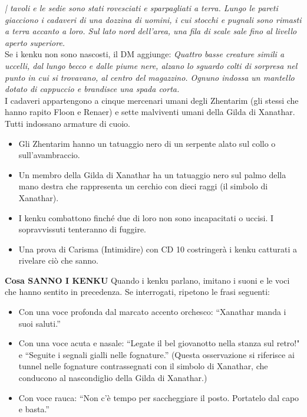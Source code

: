 \documentclass{article}
\begin{document}
\textit{| tavoli e le sedie sono stati rovesciati e sparpagliati a
terra. Lungo le pareti giacciono i cadaveri di una dozzina
di uomini, i cui stocchi e pugnali sono rimasti a terra
accanto a loro. Sul lato nord dell'area, una fila di scale
sale fino al livello aperto superiore.} \\
Se i kenku non sono nascosti, il DM aggiunge:
\textit{Quattro basse creature simili a uccelli, dal lungo becco
e dalle piume nere, alzano lo sguardo colti di sorpresa
nel punto in cui si trovavano, al centro del magazzino.
Ognuno indossa un mantello dotato di cappuccio e
brandisce una spada corta.}\\

I cadaveri appartengono a cinque mercenari umani degli Zhentarim (gli stessi che hanno rapito Floon e Renaer) e sette malviventi umani della Gilda di Xanathar. Tutti indossano armature di cuoio.

\begin{itemize}
    \item Gli Zhentarim hanno un tatuaggio nero di un serpente alato sul collo o sull'avambraccio.
    \item Un membro della Gilda di Xanathar ha un tatuaggio nero sul palmo della mano destra che rappresenta un cerchio con dieci raggi (il simbolo di Xanathar).
    \item I kenku combattono finché due di loro non sono incapacitati o uccisi. I sopravvissuti tenteranno di fuggire.
    \item Una prova di Carisma (Intimidire) con CD 10 costringerà i kenku catturati a rivelare ciò che sanno.
\end{itemize} 

\textbf{Cosa SANNO I KENKU} Quando i kenku parlano, imitano i suoni e le voci che
hanno sentito in precedenza. Se interrogati, ripetono le
frasi seguenti: 
\begin{itemize}
    \item Con una voce profonda dal marcato accento orchesco:
    “Xanathar manda i suoi saluti.”
    \item Con una voce acuta e nasale: “Legate il bel giovanotto
    nella stanza sul retro!" e “Seguite i segnali gialli
    nelle fognature.” (Questa osservazione si riferisce ai
    tunnel nelle fognature contrassegnati con il simbolo di
    Xanathar, che conducono al nascondiglio della Gilda di
    Xanathar.)
    \item Con voce rauca: “Non c'è tempo per saccheggiare il
    posto. Portatelo dal capo e basta.”

\end{itemize}
\end{document}
